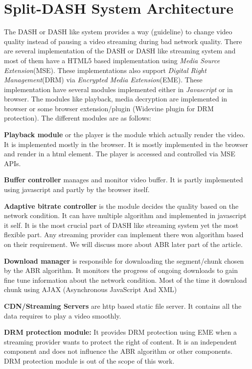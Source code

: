 \section{Split-DASH System Architecture}
The DASH or DASH like system provides a way (guideline) to change video quality instead of pausing a video streaming during bad network quality. There are several implementation of the DASH or DASH like streaming system and most of them have a HTML5 based implementation using {\it Media Source Extension}(MSE)\cite{wiki:dash,w3c:mse}. These implementations also support {\it Digital Right Management}(DRM) via {\it Encrypted Media Extension}(EME)\cite{w3c:eme}. These implementation have several modules implemented either in {\it Javascript} or in browser. The modules like playback, media decryption are implemented in browser or some browser extension/plugin (\ie Widevine plugin for DRM protection). The different modules are as follows:

{\bf Playback module} or the player is the module which actually render the video. It is implemented mostly in the browser. It is mostly implemented in the browser and render in a html element. The player is accessed and controlled via MSE APIs.

{\bf Buffer controller} manages and monitor video buffer. It is partly implemented using javascript and partly by the browser itself.

{\bf Adaptive bitrate controller} is the module decides the quality based on the network condition. It can have multiple algorithm and implemented in javascript it self. It is the most crucial part of DASH like streaming system yet the most flexible part. Any streaming provider can implement there won algorithm based on their requirement. We will discuss more about ABR later part of the article.

{\bf Download manager} is responsible for downloading the segment/chunk chosen by the ABR algorithm. It monitors the progress of ongoing downloads to gain fine tune information about the network condition. Most of the time it download chunk using AJAX (Asynchronous JavaScript And XML)


{\bf CDN/Streaming Servers} are http based static file server. It contains all the data requires to play a video smoothly.

{\bf DRM protection module:} It provides DRM protection using EME when a streaming provider wants to protect the right of content. It is an independent component and does not influence the ABR algorithm or other components. DRM protection module is out of the scope of this work.

